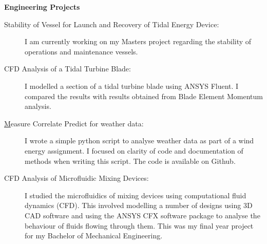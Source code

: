 \documentclass[letterpaper,11pt]{article}
\newcommand{\resheading}[1]{{\large \colorbox{mygrey}{\begin{minipage}{\textwidth}{\textbf{#1 \vphantom{p\^{E}}}}\end{minipage}}}}
\begin{document}
\resheading{Engineering Projects}

\begin{description}
\item[Stability of Vessel for Launch and Recovery of Tidal Energy Device:] {I am currently working on my Masters project regarding the stability of operations and maintenance vessels.}
\item[CFD Analysis of a Tidal Turbine Blade:] {I modelled a section of a tidal turbine blade using ANSYS Fluent. I compared the results with results obtained from Blade Element Momentum analysis.}

\item[{\href{https://github.com/peteretep/measure-correlate-predict}Measure Correlate Predict for weather data}:] { I wrote a simple python script to analyse weather data as part of a wind energy assignment. I focused on clarity of code and documentation of methods when writing this script. The code is available on Github.}

\item[CFD Analysis of Microfluidic Mixing Devices:] {I studied the microfluidics of mixing devices using computational fluid dynamics (CFD). This involved modelling a number of designs using 3D CAD software and using the ANSYS CFX software package to analyse the behaviour of fluids flowing through them. This was my final year project for my Bachelor of Mechanical Engineering. }

\end{description}
\end{document}
